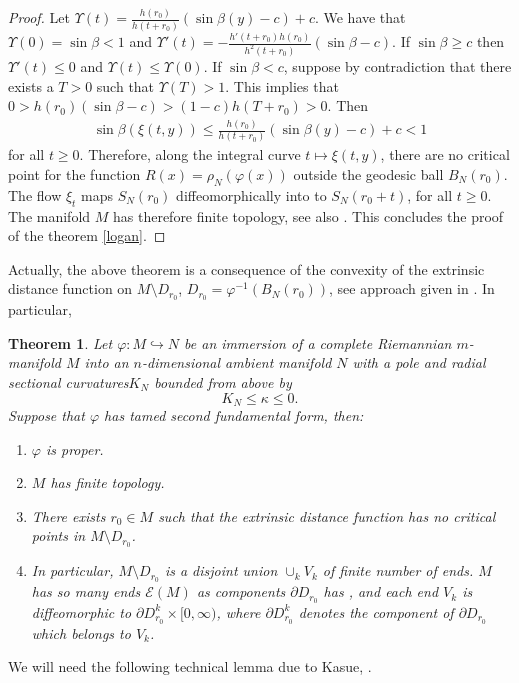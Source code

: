 \documentclass[a4paper]{amsart}
\newtheorem{theorem}{Theorem}[section]
\theoremstyle{definition}
\numberwithin{equation}{section}
\begin{document}
\begin{proof}
Let $\Upsilon(t)=\displaystyle\frac{h(r_0)}{h(t + r_0)}(\sin\beta(y) - c) +c$. We have that $\Upsilon(0)=\sin \beta <1$ and $\Upsilon'(t)=\displaystyle -\frac{h'(t+r_{0})h(r_{0})}{h^{2}(t+r_{0})}(\sin \beta -c)$. If $\sin \beta \geq c$ then $\Upsilon'(t)\leq 0$ and $\Upsilon(t)\leq \Upsilon(0)$. If $\sin \beta <c$, suppose by contradiction that there exists a $T>0$ such that $\Upsilon(T)>1$. This implies that $0>h(r_{0})(\sin\beta -c)> (1-c)h(T+r_{0})>0$. Then
\begin{eqnarray*}
\sin\beta(\xi(t,y))\leq \displaystyle\frac{h(r_0)}{h(t + r_0)}(\sin\beta(y) - c) +c  < 1
\end{eqnarray*}
for all $t \geq 0$. Therefore, along the integral curve $t
\mapsto\xi(t,y)$, there are no critical point for the function $R(x)
= \rho_{N} (\varphi(x))$ outside the geodesic ball $B_{N}(r_{0})$. The flow  $\xi_{t}$ maps $S_{N}(r_{0})$ diffeomorphically into to $S_{N}(r_{0}+t)$, for all $t\geq 0$. The manifold  $M$ has therefore finite topology, see also \cite{cheeger}. This
concludes the proof of the theorem \ref{logan}.
\end{proof}

Actually, the above theorem is a consequence of the convexity of the extrinsic distance  function on $M\setminus D_{r_0}$, $D_{r_0}=\varphi^{-1}(B_{N}(r_0))$, see approach given in \cite{GPGap}. In particular,

\begin{theorem}\cite{Pac2, Pac, GPGap}\label{tamed-theorem}
Let $\varphi: M \hookrightarrow N$ be an immersion  of a complete Riemannian
$m$-manifold $M$ into an  $n$-dimensional ambient manifold $N$ with a pole and radial sectional curvatures$K_N$ bounded from above by
$$
K_N\leq \kappa\leq 0.
$$
Suppose that $\varphi$ has tamed second fundamental form, then:
\begin{enumerate}
\item $\varphi$ is proper.
\item $M$ has finite topology.
\item There exists $r_0\in M$ such that the extrinsic distance function has no critical points in $M\setminus D_{r_0}$.
\item In particular, $M\setminus D_{r_0}$ is a disjoint union  $\cup_k V_k$ of finite number of ends. $M$ has so many ends ${\mathcal{E}}(M)$ as components $\partial D_{r_0}$ has , and each end $V_k$ is diffeomorphic to $\partial D_{r_0}^k\times [0,\infty)$, where $\partial D_{r_0}^k$ denotes the component of $\partial D_{r_0}$ which belongs to $V_k$.  
\end{enumerate}
\end{theorem}
 We will need the following technical lemma due to Kasue, \cite{KS}.
 
\end{document}

